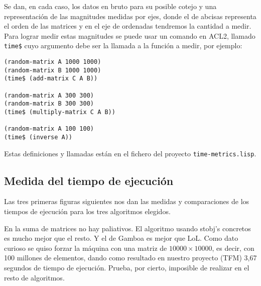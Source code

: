 \documentclass[a4paper,10pt]{article}
\begin{document}
Se dan, en cada caso, los datos en bruto para su posible cotejo y una representación de las magnitudes medidas por ejes, donde el de abcisas representa el orden de las matrices y en el eje de ordenadas tendremos la cantidad a medir. Para lograr medir estas magnitudes se puede usar un comando en ACL2, llamado \texttt{time\$} cuyo argumento debe ser la llamada a la función a medir, por ejemplo:

\par \vspace{10pt}

\begin{lstlisting}[language=clips]
(random-matrix A 1000 1000)
(random-matrix B 1000 1000)
(time$ (add-matrix C A B))

(random-matrix A 300 300)
(random-matrix B 300 300)
(time$ (multiply-matrix C A B))

(random-matrix A 100 100)
(time$ (inverse A))
\end{lstlisting}

\par \vspace{10pt}

Estas definiciones y llamadas están en el fichero del proyecto \texttt{time-metrics.lisp}.

\vspace{24pt}
\subsection{Medida del tiempo de ejecución}
\par \vspace{10pt}

Las tres primeras figuras siguientes nos dan las medidas y comparaciones de los tiempos de ejecución para los tres algoritmos elegidos.

\par \vspace{10pt}

En la suma de matrices no hay paliativos. El algoritmo usando stobj's concretos es mucho mejor que el resto. Y el de Gamboa es mejor que LoL. Como dato curioso se quiso forzar la máquina con una matriz de $10000 \times 10000$, es decir, con 100 millones de elementos, dando como resultado en nuestro proyecto (TFM) 3,67 segundos de tiempo de ejecución. Prueba, por cierto, imposible de realizar en el resto de algoritmos.

\par \vspace{10pt}
\end{document}
